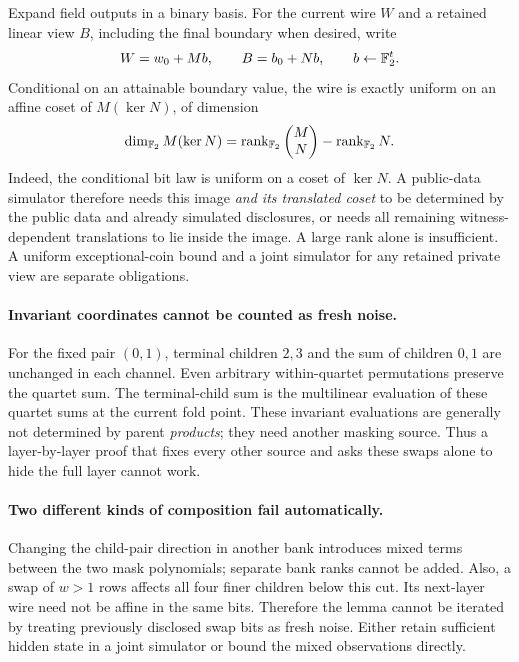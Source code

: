 \documentclass[11pt]{article}
\begin{document}
Expand field outputs in a binary basis. For the current wire $W$ and a retained linear view $B$, including the final boundary when desired, write
\[
 W=w_0+M b,\qquad B=b_0+N b,\qquad b\gets\mathbb{F}_2^t.
\]
Conditional on an attainable boundary value, the wire is exactly uniform on an affine coset of $M(\ker N)$, of dimension
\[
 \dim_{\mathbb{F}_2}M(\ker N)
 =\operatorname{rank}_{\mathbb{F}_2}\begin{pmatrix}M\\N\end{pmatrix}
  -\operatorname{rank}_{\mathbb{F}_2}N.
\]
Indeed, the conditional bit law is uniform on a coset of $\ker N$. A public-data simulator therefore needs this image \emph{and its translated coset} to be determined by the public data and already simulated disclosures, or needs all remaining witness-dependent translations to lie inside the image. A large rank alone is insufficient. A uniform exceptional-coin bound and a joint simulator for any retained private view are separate obligations.

\paragraph{Invariant coordinates cannot be counted as fresh noise.} For the fixed pair $(0,1)$, terminal children $2,3$ and the sum of children $0,1$ are unchanged in each channel. Even arbitrary within-quartet permutations preserve the quartet sum. The terminal-child sum is the multilinear evaluation of these quartet sums at the current fold point. These invariant evaluations are generally not determined by parent \emph{products}; they need another masking source. Thus a layer-by-layer proof that fixes every other source and asks these swaps alone to hide the full layer cannot work.

\paragraph{Two different kinds of composition fail automatically.} Changing the child-pair direction in another bank introduces mixed terms between the two mask polynomials; separate bank ranks cannot be added. Also, a swap of $w>1$ rows affects all four finer children below this cut. Its next-layer wire need not be affine in the same bits. Therefore the lemma cannot be iterated by treating previously disclosed swap bits as fresh noise. Either retain sufficient hidden state in a joint simulator or bound the mixed observations directly.
\end{document}

